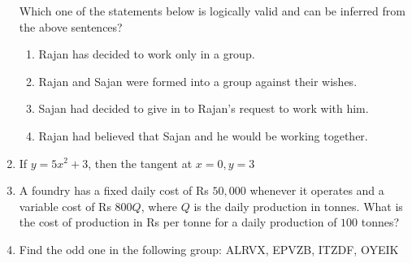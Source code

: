 \documentclass[a4paper,10pt]{article}
\begin{document}
\begin{enumerate}
    Which one of the statements below is logically valid and can be inferred from the above sentences?
    
    \hfill{}
    \begin{enumerate}[label=\Alph*)]
        \item Rajan has decided to work only in a group.
        \item Rajan and Sajan were formed into a group against their wishes.
        \item Sajan had decided to give in to Rajan's request to work with him.
        \item Rajan had believed that Sajan and he would be working together.
    \end{enumerate}

    \item If $y = 5x^2 + 3$, then the tangent at $x = 0, y = 3$
    
    \hfill{}
    \begin{enumerate}[label=\Alph*)]
    \end{enumerate}

    \item A foundry has a fixed daily cost of Rs $50,000$ whenever it operates and a variable cost of Rs $800Q$, where $Q$ is the daily production in tonnes. What is the cost of production in Rs per tonne for a daily production of $100$ tonnes?
    
    \hfill{}

    \item Find the odd one in the following group: ALRVX, EPVZB, ITZDF, OYEIK
    
    \hfill{}
    \begin{enumerate}[label=\Alph*)]
    \end{enumerate}


\end{enumerate}
\end{document}

